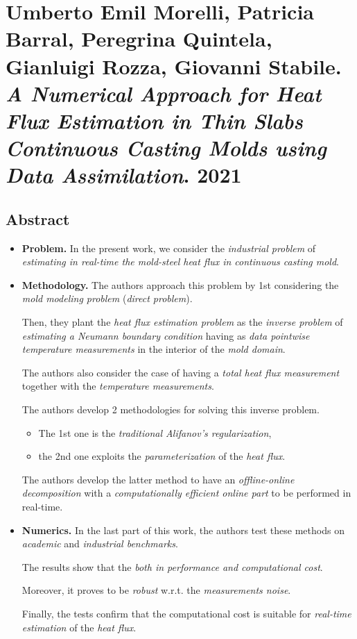 \documentclass{book}
\numberwithin{equation}{section}
\begin{document}
\section{Umberto Emil Morelli, Patricia Barral, Peregrina Quintela, Gianluigi Rozza, Giovanni Stabile. \textit{A Numerical Approach for Heat Flux Estimation in Thin Slabs Continuous Casting Molds using Data Assimilation}. 2021}

\subsection*{Abstract}
\begin{itemize}
    \item \textbf{Problem.} In the present work, we consider the \textit{industrial problem} of \textit{estimating in real-time the mold-steel heat flux in continuous casting mold}.
    \item \textbf{Methodology.} The authors approach this problem by 1st considering the \textit{mold modeling problem} (\textit{direct problem}). 
    
    Then, they plant the \textit{heat flux estimation problem} as the \textit{inverse problem} of \textit{estimating a Neumann boundary condition} having as \textit{data pointwise temperature measurements} in the interior of the \textit{mold domain}.
    
    The authors also consider the case of having a \textit{total heat flux measurement} together with the \textit{temperature measurements}.
    
    The authors develop 2 methodologies for solving this inverse problem.
    \begin{itemize}
        \item The 1st one is the \textit{traditional Alifanov's regularization},
        \item the 2nd one exploits the \textit{parameterization} of the \textit{heat flux}.
    \end{itemize}
    The authors develop the latter method to have an \textit{offline-online decomposition} with a \textit{computationally efficient online part} to be performed in real-time.
    \item \textbf{Numerics.} In the last part of this work, the authors test these methods on \textit{academic} and \textit{industrial benchmarks}.
    
    The results show that the \textit{ both in performance and computational cost}.
    
    Moreover, it proves to be \textit{robust} w.r.t. the \textit{measurements noise}.
    
    Finally, the tests confirm that the computational cost is suitable for \textit{real-time estimation} of the \textit{heat flux}.
\end{itemize}
\end{document}
